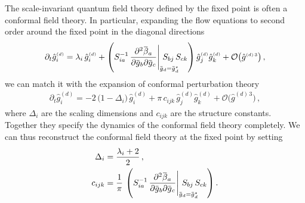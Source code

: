 \documentclass[11pt]{book}
\newcommand{\overbar}[1]{\mkern 1.5mu\overline{\mkern-1.5mu#1\mkern-1.5mu}\mkern 1.5mu}
\numberwithin{equation}{chapter}
\begin{document}
The scale-invariant quantum field theory defined by the fixed point
is often a conformal field theory.
In particular, expanding the flow equations to second order
around the fixed point in the diagonal directions
\begin{align}
  \partial_t \hat g_i^{\scriptscriptstyle{(d)}} =
  \lambda_i \,
  \hat g_i^{\scriptscriptstyle{(d)}}
  +
  \left(
    S_{ia}^{-1} \,
    \frac{ \partial^2 \overbar \beta_a }
    { \partial \overbar g_b \partial \overbar g_c }
    \Bigg|_{ \overbar g_d = \overbar g_d^\star }
    \hspace{-7mm}
    S_{bj} \,
    S_{ck}
  \right)
  \hat g_j^{\scriptscriptstyle{(d)}}
  \hat g_k^{\scriptscriptstyle{(d)}}
  + \mathcal O \big( \hat g^{\scriptscriptstyle{(d)} \, 3} \big) \,,
\end{align}
we can match it with the expansion of conformal perturbation
theory
\begin{align}
  \partial_t \hat g_i^{\scriptscriptstyle{(d)}} =
  -2 \, \big( 1 - \Delta_i \big) \,
  \hat g_i^{\scriptscriptstyle{(d)}}
  +
  \pi \, c_{ijk} \,
  \hat g_j^{\scriptscriptstyle{(d)}}
  \hat g_k^{\scriptscriptstyle{(d)}}
  + \mathcal O \big( \hat g^{\scriptscriptstyle{(d)} \, 3} \big) \,,
\end{align}
where $\Delta_i$ are the scaling dimensions and $c_{ijk}$
are the structure constants. Together they specify the
dynamics of the conformal field theory completely.
We can thus reconstruct the conformal field theory at the fixed
point by setting
\begin{align}
  \Delta_i &= \frac{\lambda_i + 2}{2} \,, \\
  c_{ijk} &= \frac{1}{\pi} \,
  \left(
    S_{ia}^{-1} \,
    \frac{ \partial^2 \overbar \beta_a }
    { \partial \overbar g_b \partial \overbar g_c }
    \Bigg|_{ \overbar g_d = \overbar g_d^\star }
    \hspace{-7mm}
    S_{bj} \,
    S_{ck}
  \right) .
\end{align}
\end{document}
